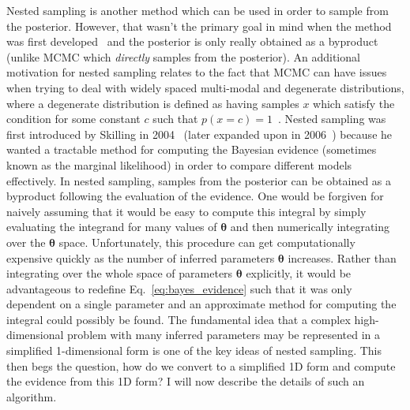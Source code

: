 Nested sampling is another method which can be used in order to 
sample from the posterior. However, 
that wasn't the primary goal in mind when the method was 
first developed~\cite{2004AIPC..735..395S,skilling2006} 
and the posterior is only really obtained as a 
byproduct (unlike \ac{MCMC} which \textit{directly} samples from the 
posterior). An additional motivation for nested sampling relates to 
the fact that \ac{MCMC} can have issues when trying to deal with 
widely spaced multi-modal and degenerate distributions, where a 
degenerate distribution is defined as having samples $x$ which 
satisfy the condition for some constant $c$ such that 
$p(x=c)=1$~. Nested sampling was first introduced by 
Skilling in 2004~\cite{2004AIPC..735..395S} (later expanded 
upon in 2006~\cite{skilling2006}) because he wanted a tractable method for 
computing the Bayesian evidence (sometimes known as the marginal 
likelihood) in order to compare different models effectively. In 
nested sampling, samples from the posterior can be obtained as a 
byproduct following the evaluation of the evidence. One would be forgiven for  
naively assuming that it would be easy to compute this integral by 
simply evaluating the integrand for many values of $\bm{\theta}$ and then 
numerically integrating over the $\bm{\theta}$ space. Unfortunately, 
this procedure can get computationally expensive quickly as the 
number of inferred parameters $\bm{\theta}$ increases. Rather than 
integrating over the whole space of parameters $\bm{\theta}$ explicitly, 
it would be advantageous to redefine Eq.~\ref{eq:bayes_evidence} such that 
it was only dependent on a single parameter and an approximate 
method for computing the integral could possibly be found. The 
fundamental idea that a complex high-dimensional problem with 
many inferred parameters may be represented in a simplified 
1-dimensional form is one of the key ideas of nested sampling. 
This then begs the question, how do we convert 
to a simplified 1D form and compute the evidence from this 1D form? I 
will now describe the details of such an algorithm.

